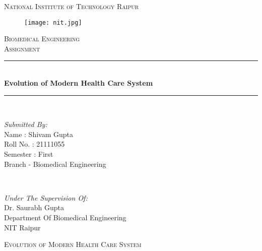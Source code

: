 \documentclass[12pt]{article}
\begin{document}
\begin{titlepage}
\newcommand{\HRule}{\rule{\linewidth}{0.5mm}}
\center
\textsc{\LARGE National Institute of Technology Raipur}\\[1.0cm]
\begin{figure}[h]
\centering
\texttt{[image: nit.jpg]}
\end{figure}
\textsc{\Large Biomedical Engineering}\\[0.5cm] 
\textsc{\large Assignment}\\[0.5cm]
\HRule\\[0.4cm]
	
	{\huge\bfseries Evolution of Modern Health Care System}\\[0.1cm]
	\HRule\\[1.1cm]
	\begin{minipage}{0.4\textwidth}
		\begin{flushleft}
			\large
			\textit{Submitted By:}\\
          		Name : Shivam Gupta \\
			   Roll No. : 21111055\\
			   Semester : First\\
			   Branch - Biomedical Engineering 
			   
			\end{flushleft}
	\end{minipage}
	~
	\begin{minipage}{0.5\textwidth}
		\begin{flushright}
			\large
			\textit{Under The Supervision Of:}\\
			Dr. Saurabh Gupta\\
			Department Of Biomedical Engineering\\
			NIT Raipur
		\end{flushright}
	\end{minipage}
	\vfill\vfill\vfill 
	
	
	\vfill 
\end{titlepage}

\clearpage
\newpage


\textsc{\Large Evolution of Modern Health Care System}\\[1.5cm]
\end{document}
